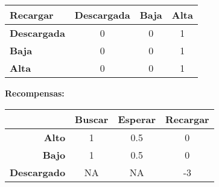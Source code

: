 \begin{enumerate}[label=\alph*.]
\begin{table}[H]
\begin{tabular}{|l|c|c|c|}
    \hline
    \textbf{Recargar}     & \textbf{Descargada} & \textbf{Baja} & \textbf{Alta} \\ \hline   
    \textbf{Descargada} & 0   & 0   & 1       \\ \hline   
    \textbf{Baja} & 0   & 0    & 1       \\ \hline              
    \textbf{Alta} & 0     & 0     & 1          \\ \hline  
    \end{tabular}
    \end{table}
    \textbf{Recompensas:}\\
    \begin{table}[H]
    \centering
    \begin{tabular}{| r | c|c|c |}
    \hline
     & \textbf{Buscar} & \textbf{Esperar} & \textbf{Recargar}\\
    \hline
    \textbf{Alto} & 1 & 0.5 & 0 \\
    \hline
    \textbf{Bajo} & 1 & 0.5 & 0 \\
    \hline
    \textbf{Descargado} & NA & NA & -3 \\
    \hline
    \end{tabular}
    \end{table} 
    \end{enumerate}